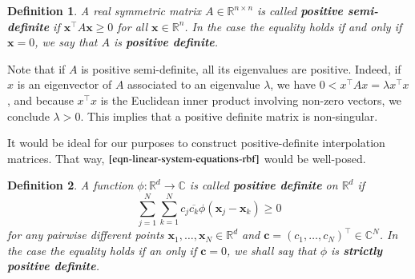 \documentclass[12pt]{report} %
\newtheorem{definition}{Definition}
\newcommand{\tmmathbf}[1]{\ensuremath{\boldsymbol{#1}}}
\newcommand{\tmstrong}[1]{\textbf{#1}}
\begin{document}
\begin{definition}
  A real symmetric matrix $A \in \mathbb{R}^{n \times n}$ is called
  {\tmstrong{positive semi-definite}} if $\tmmathbf{x}^{\top} A\tmmathbf{x}
  \geq 0$ for all $\tmmathbf{x} \in \mathbb{R}^n$. In the case the equality
  holds if and only if $\tmmathbf{x}= 0$, we say that $A$ is
  {\tmstrong{positive definite}}. 
\end{definition}

Note that if $A$ is positive semi-definite, all its eigenvalues are positive.
Indeed, if $x$ is an eigenvector of $A$ associated to an eigenvalue $\lambda$,
we have $0 < x^{\top} A x = \lambda x^{\top} x$, and because $x^{\top} x$ is
the Euclidean inner product involving non-zero vectors, we conclude $\lambda >
0$. This implies that a positive definite matrix is non-singular.

It would be ideal for our purposes to construct positive-definite
interpolation matrices. That way, $\eqref{eqn-linear-system-equations-rbf}$ would
be well-posed.

\begin{definition}\label{def-positive-definite-functions}
  A function $\phi : \mathbb{R}^d \rightarrow \mathbb{C}$ is called
  {\tmstrong{positive definite}} on $\mathbb{R}^d$ if
  \begin{equation}
    \sum_{j = 1}^N \sum_{k = 1}^N c_j \overline{c_k} \phi (\tmmathbf{x}_j
    -\tmmathbf{x}_k) \geq 0 \label{positivedefinitefunctioncomplexdefinition}
  \end{equation}
  for any pairwise different points $\tmmathbf{x}_1, \ldots, \tmmathbf{x}_N
  \in \mathbb{R}^d$ and $\tmmathbf{c}= (c_1, \ldots, c_N)^{\top} \in
  \mathbb{C}^N$. In the case the equality holds if an only if $\tmmathbf{c}=
  0$, we shall say that $\phi$ is {\tmstrong{strictly positive definite}}.
\end{definition}
\end{document}
